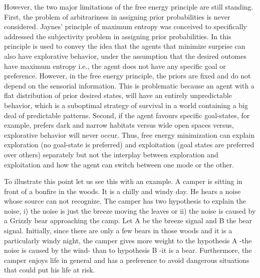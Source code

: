 \documentclass[11pt, onecolumn]{article}
\begin{document}
However, the two major limitations  of the free energy principle are still standing. First, the problem of arbitrariness in assigning prior probabilities is 
never considered. Jaynes' \citep{Jaynes68priorprobabilities} principle of maximum entropy was conceived to specifically addressed the subjectivity problem in assigning prior probabilities. In \citep{schwartenbeck_exploration_2013} this principle is used to convey the idea that the agents that minimize surprise can also have explorative behavior, under the assumption that the desired outomes have maximum entropy i.e., the agent does not have any specific goal or preference. However, in the free energy principle, the priors are fixed and do not depend on the sensorial information. This is problematic because an agent with a flat distribution of prior desired states, will have an entirely unpredictable behavior, which is a suboptimal strategy of survival in a world containing a big deal of predictable patterns. Second, if the agent favours specific goal-states, for example, prefers dark and narrow habitats versus  wide open spaces versus, explorative behavior will never occur. Thus, free energy minimization can explain exploration (no goal-state is preferred) and exploitation (goal states are preferred over others) separately but not the interplay between exploration and exploitation and how the agent can switch between one mode or the other.

To illustrate this point let us see this with an example. A camper is sitting in front of a bonfire in the woods. It is a chilly and windy day. He hears a noise whose source can not recognize. The camper has two hypothesis to explain the noise, i) the noise is just the breeze moving the leaves or ii) the noise is caused by a Grizzly bear approaching the camp. Let A be the breeze signal and B the bear signal. Initially, since there are only a few bears in those woods and it is a particularly windy night, the camper gives more weight to the hypothesis A -the noise is caused by the wind- than to hypothesis B -it is a bear. Furthermore, the camper enjoys life in general and has a preference to avoid dangerous situations that could put his life at risk.  
\end{document}

